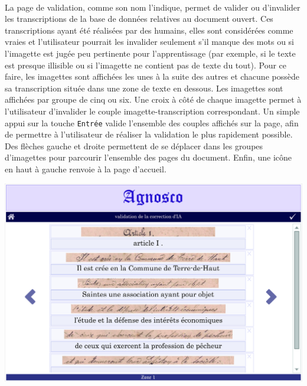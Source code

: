 \paragraph{}
La page de validation, comme son nom l’indique, permet de valider ou d’invalider les transcriptions de la base de données relatives au document ouvert. Ces transcriptions ayant été réalisées par des humains, elles sont considérées comme vraies et l’utilisateur pourrait les invalider seulement s’il manque des mots ou si l’imagette est jugée peu pertinente pour l’apprentissage (par exemple, si le texte est presque illisible ou si l’imagette ne contient pas de texte du tout).
\newline{}
Pour ce faire, les imagettes sont affichées les unes à la suite des autres et chacune possède sa transcription située dans une zone de texte en dessous. Les imagettes sont affichées par groupe de cinq ou six. Une croix à côté de chaque imagette permet à l’utilisateur d’invalider le couple imagette-transcription correspondant. Un simple appui sur la touche \texttt{Entrée} valide l’ensemble des couples affichés sur la page, afin de permettre à l’utilisateur de réaliser la validation le plus rapidement possible. Des flèches gauche et droite permettent de se déplacer dans les groupes d’imagettes pour parcourir l’ensemble des pages du document. Enfin, une icône en haut à gauche renvoie à la page d’accueil.

\begin{mdframed}[frametitle={Figure 2 : Maquette de la page de validation des annotations}, innerbottommargin=10]
\begin{center}
\includegraphics[scale=0.04]{assets/maquetteIHMvalidation1.jpg}
\end{center}
\end{mdframed}

